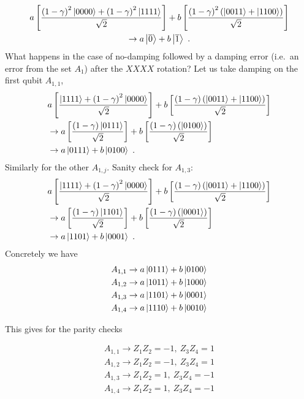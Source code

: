 \documentclass[twoside]{article}
\begin{document}
\begin{gather}
a\left[ \frac{\left(1-\gamma\right)^2\Ket{0000}+\left(1-\gamma\right)^2\Ket{1111}}{\sqrt{2}}\right] + b\left[ \frac{\left(1-\gamma\right)^2\left(\Ket{0011}+\Ket{1100}\right)}{\sqrt{2}}\right]\\
\rightarrow a \Ket{\overline{0}}+b\Ket{\overline{1}}\ .
\end{gather}
What happens in the case of no-damping followed by a damping error (i.e.~an error from the set $A_1$) after the $XXXX$ rotation? Let us take damping on the first qubit $A_{1,1}$,
\begin{align}
&a\left[ \frac{\Ket{1111}+\left(1-\gamma\right)^2\Ket{0000}}{\sqrt{2}}\right] + b\left[ \frac{\left(1-\gamma\right)\left(\Ket{0011}+\Ket{1100}\right)}{\sqrt{2}}\right]\\
&\rightarrow  a\left[ \frac{(1-\gamma)\Ket{0111}}{\sqrt{2}}\right] + b\left[ \frac{\left(1-\gamma\right)\left(\Ket{0100}\right)}{\sqrt{2}}\right]\\
&\rightarrow a\Ket{0111}+b\Ket{0100}\ .
\end{align}
Similarly for the other $A_{1,j}$. Sanity check for $A_{1,3}$:
\begin{align}
&a\left[ \frac{\Ket{1111}+\left(1-\gamma\right)^2\Ket{0000}}{\sqrt{2}}\right] + b\left[ \frac{\left(1-\gamma\right)\left(\Ket{0011}+\Ket{1100}\right)}{\sqrt{2}}\right]\\
&\rightarrow  a\left[ \frac{(1-\gamma)\Ket{1101}}{\sqrt{2}}\right] + b\left[ \frac{\left(1-\gamma\right)\left(\Ket{0001}\right)}{\sqrt{2}}\right]\\
&\rightarrow a\Ket{1101}+b\Ket{0001}\ .
\end{align}
Concretely we have
\begin{align}
A_{1,1} \rightarrow a\Ket{0111}+b\Ket{0100}\\
A_{1,2} \rightarrow a\Ket{1011}+b\Ket{1000}\\
A_{1,3} \rightarrow a\Ket{1101}+b\Ket{0001}\\
A_{1,4} \rightarrow a\Ket{1110}+b\Ket{0010}\\
\end{align}

This gives for the parity checks

\begin{align}
A_{1,1} \rightarrow Z_1Z_2 = -1,~Z_3Z_4 = 1\\
A_{1,2} \rightarrow Z_1Z_2 = -1,~Z_3Z_4 = 1\\
A_{1,3} \rightarrow Z_1Z_2 = 1,~Z_3Z_4 = -1\\
A_{1,4} \rightarrow Z_1Z_2 = 1,~Z_3Z_4 = -1\\
\end{align}
\end{document}
